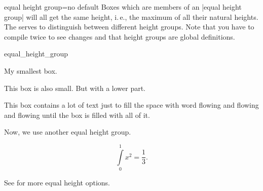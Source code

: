 \clearpage
\begin{docTcbKey}[][doc updated=2014-11-07]{equal height group}{=}{no default}
  Boxes which are members of an |equal height group| will all get the
  same height, i.\,e., the maximum of all their natural heights. The
   serves to distinguish between different height groups.
  Note that you have to compile twice to see changes and
  that height groups are global definitions.


\begin{exdispExample}[runs=2]{equal_height_group}

\begin{tcolorbox}[equal height group=A,adjusted title={One}]
  My smallest box.
\end{tcolorbox}%
\begin{tcolorbox}[equal height group=A,adjusted title={Two}]
  This box is also small.
  \tcblower
  But with a lower part.
\end{tcolorbox}%
\begin{tcolorbox}[equal height group=A,adjusted title={Three}]
  This box contains a lot of text just to fill the space
  with word flowing and flowing and flowing until the box
  is filled with all of it.
\end{tcolorbox}\linebreak
%
%
\begin{tcolorbox}[equal height group=B]
  Now, we use another equal height group.
\end{tcolorbox}%
\begin{tcolorbox}[equal height group=B,after=]
  \begin{equation*}
    \int\limits_{0}^{1} x^2 = \frac13.
  \end{equation*}
\end{tcolorbox}
\end{exdispExample}
\end{docTcbKey}

\medskip
\begin{marker}
See  for more equal height options.
\end{marker}


